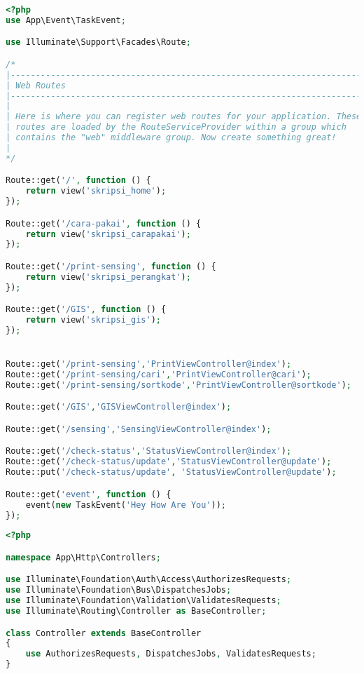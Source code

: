 \begin{lstlisting}[language=PHP, caption=web.php]
<?php
use App\Event\TaskEvent;

use Illuminate\Support\Facades\Route;

/*
|--------------------------------------------------------------------------
| Web Routes
|--------------------------------------------------------------------------
|
| Here is where you can register web routes for your application. These
| routes are loaded by the RouteServiceProvider within a group which
| contains the "web" middleware group. Now create something great!
|
*/

Route::get('/', function () {
    return view('skripsi_home');
});

Route::get('/cara-pakai', function () {
    return view('skripsi_carapakai');
});

Route::get('/print-sensing', function () {
    return view('skripsi_perangkat');
});

Route::get('/GIS', function () {
    return view('skripsi_gis');
});


Route::get('/print-sensing','PrintViewController@index');
Route::get('/print-sensing/cari','PrintViewController@cari');
Route::get('/print-sensing/sortkode','PrintViewController@sortkode');

Route::get('/GIS','GISViewController@index');

Route::get('/sensing','SensingViewController@index');

Route::get('/check-status','StatusViewController@index');
Route::get('/check-status/update','StatusViewController@update');
Route::put('/check-status/update', 'StatusViewController@update');

Route::get('event', function () {
    event(new TaskEvent('Hey How Are You'));
});


\end{lstlisting}


\begin{lstlisting}[language=PHP, caption=controller.php]
<?php

namespace App\Http\Controllers;

use Illuminate\Foundation\Auth\Access\AuthorizesRequests;
use Illuminate\Foundation\Bus\DispatchesJobs;
use Illuminate\Foundation\Validation\ValidatesRequests;
use Illuminate\Routing\Controller as BaseController;

class Controller extends BaseController
{
    use AuthorizesRequests, DispatchesJobs, ValidatesRequests;
}
\end{lstlisting}



